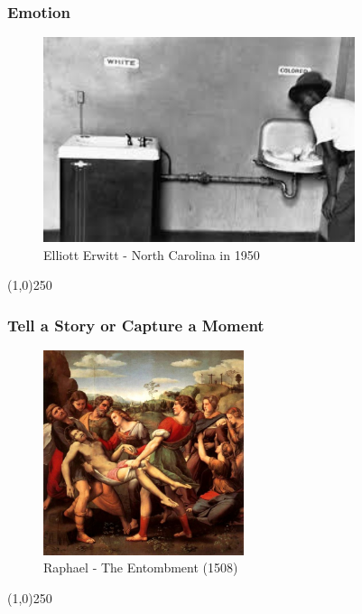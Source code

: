 \begin{frame}
\frametitle{Emotion}
\begin{figure}
	\centering
		\includegraphics[height=6cm]{img/candc/whitesNonWhites.jpg}
	\caption{Elliott Erwitt - North Carolina in 1950}
	\label{fig:ElliottErwittNC}
\end{figure}
\end{frame}
\begin{center}\line(1,0){250}\end{center}





\begin{frame}
\frametitle{Tell a Story or Capture a Moment}
\begin{figure}
	\centering
		\includegraphics[height=6cm]{img/candc/18-Raphael-Paintings.jpg}
	\caption{Raphael - The Entombment (1508)}
	\label{fig:RaphaelEntombment}
\end{figure}
\end{frame}
\begin{center}\line(1,0){250}\end{center}




